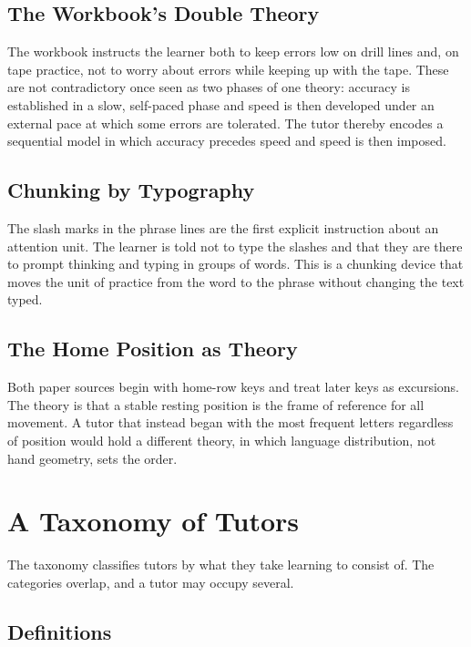 \section{The Workbook's Double Theory}

The workbook instructs the learner both to keep errors low on drill lines and, on tape practice, not to worry about errors while keeping up with the tape. These are not contradictory once seen as two phases of one theory: accuracy is established in a slow, self-paced phase and speed is then developed under an external pace at which some errors are tolerated. The tutor thereby encodes a sequential model in which accuracy precedes speed and speed is then imposed. 

\section{Chunking by Typography}

The slash marks in the phrase lines are the first explicit instruction about an attention unit. The learner is told not to type the slashes and that they are there to prompt thinking and typing in groups of words. This is a chunking device that moves the unit of practice from the word to the phrase without changing the text typed.

\section{The Home Position as Theory}

Both paper sources begin with home-row keys and treat later keys as excursions. The theory is that a stable resting position is the frame of reference for all movement. A tutor that instead began with the most frequent letters regardless of position would hold a different theory, in which language distribution, not hand geometry, sets the order.

\chapter{A Taxonomy of Tutors}

The taxonomy classifies tutors by what they take learning to consist of. The categories overlap, and a tutor may occupy several.

\section{Definitions}

